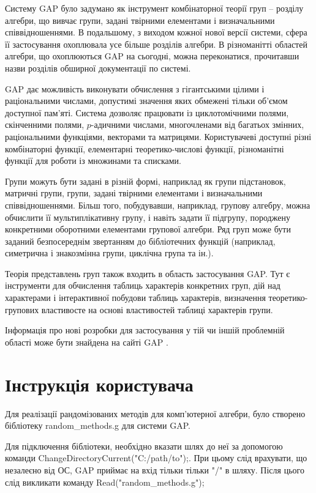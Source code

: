 Систему \textsf{GAP} було задумано як інструмент комбінаторної теорії груп -- розділу алгебри, що вивчає групи, задані твірними елементами і визначальними співвідношеннями. В подальшому, з виходом кожної нової версії системи, сфера її застосування охоплювала усе більше розділів алгебри. В різноманітті областей алгебри, що охоплюються \textsf{GAP} на сьогодні, можна переконатися, прочитавши назви розділів обширної документації по системі.

\textsf{GAP} дає можливість виконувати обчислення з гігантськими цілими і раціональними числами, допустимі значення яких обмежені тільки об'ємом доступної пам'яті. Система дозволяє працювати із циклотомічними полями, скінченними полями, $p$-адичними числами, многочленами від багатьох змінних, раціональними функціями, векторами та матрицями. Користувачеві доступні різні комбінаторні функції, елементарні теоретико-числові функції, різноманітні функції для роботи із множинами та списками.

Групи можуть бути задані в різній формі, наприклад як групи підстановок, матричні групи, групи, задані твірними елементами і визначальними співвідношеннями. Більш того, побудувавши, наприклад, групову алгебру, можна обчислити її мультиплікативну групу, і навіть задати її підгрупу, породжену конкретними оборотними елементами групової алгебри. Ряд груп може бути заданий безпосереднім звертанням до бібліотечних функцій (наприклад, симетрична і знакозмінна групи, циклічна група та ін.).

Теорія представлень груп також входить в область застосування \textsf{GAP}. Тут є інструменти для обчислення таблиць характерів конкретних груп, дій над характерами і інтерактивної побудови таблиць характерів, визначення теоретико-групових властивосте на основі властивостей таблиці характерів групи.

Інформація про нові розробки для застосування у тій чи іншій проблемній області може бути знайдена на сайті \textsf{GAP} \cite{GAP4}.

\section{Інструкція користувача}
\label{section.3.2}

Для реалізації рандомізованих методів для комп'ютерної алгебри, було створено бібліотеку \textsf{random\_methods.g} для системи \textsf{GAP}.

Для підключення бібліотеки, необхідно вказати шлях до неї за допомогою команди  \textsf{ChangeDirectoryCurrent("C:/path/to");}. При цьому слід врахувати, що незалеєно від ОС, \textsf{GAP} приймає на вхід тільки тільки "/" в шляху. Після цього слід викликати команду  \textsf{Read("random\_methods.g");}

